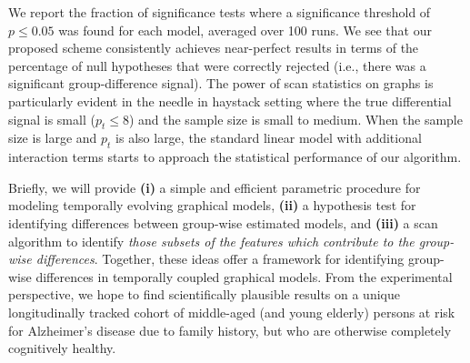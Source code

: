 We report the fraction of significance tests where a significance threshold 
of $p \leq 0.05$ was found for each model, averaged over 100 runs. 
We see that our proposed scheme consistently achieves near-perfect results in terms of the percentage of null hypotheses that 
were correctly rejected (i.e., there was a significant group-difference signal). The power of scan statistics on 
graphs is particularly evident in the needle in haystack setting where the true differential signal is small ($p_t \leq 8$)
and the sample size is small to medium. When the sample size is large and $p_t$ is also large, the standard linear model with additional interaction terms starts to approach the statistical performance of our algorithm.



Briefly, we will provide \textbf{(i)} a simple and efficient parametric procedure for modeling temporally evolving graphical models, \textbf{(ii)} a 
hypothesis test for identifying differences between group-wise estimated models, and \textbf{(iii)} a scan
algorithm to identify {\em those subsets of the features which contribute to the group-wise differences}.
Together, these ideas offer a framework for identifying group-wise differences in temporally coupled graphical models.
From the experimental perspective, we hope to find scientifically plausible results on 
a unique longitudinally tracked cohort of middle-aged (and young elderly) persons at risk for Alzheimer's disease due to family history, 
but who are otherwise completely cognitively healthy.
